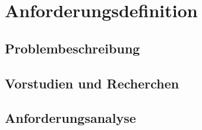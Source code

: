 \part{Anforderungsdefinition}


    \chapter{Problembeschreibung}%
       


    \chapter{Vorstudien und Recherchen}

        
        
        
        
        
        




    \chapter{Anforderungsanalyse}
    
